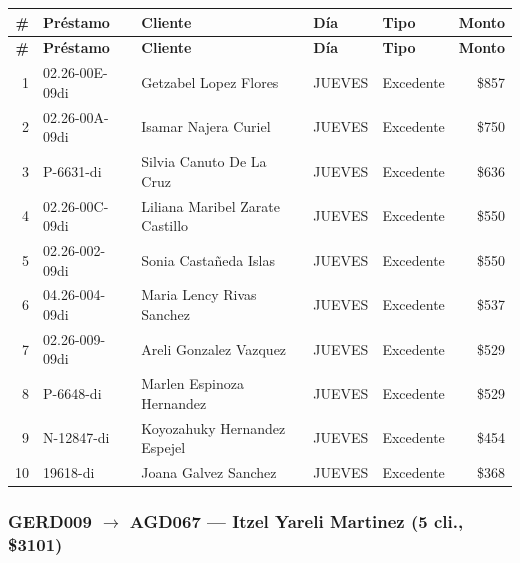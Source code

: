 \documentclass[11pt,a4paper]{article}
\newcommand{\money}[1]{\$\num{#1}}
\begin{document}
\begin{center}
\renewcommand{\arraystretch}{1.1}
\footnotesize
\begin{longtable}{rlp{5.5cm}llr}
\toprule
\textbf{\#} & \textbf{Pr\'estamo} & \textbf{Cliente} & \textbf{D\'ia} & \textbf{Tipo} & \textbf{Monto} \\
\midrule
\endfirsthead
\toprule
\textbf{\#} & \textbf{Pr\'estamo} & \textbf{Cliente} & \textbf{D\'ia} & \textbf{Tipo} & \textbf{Monto} \\
\midrule
\endhead
1 & 02.26-00E-09di & Getzabel Lopez Flores & JUEVES & Excedente & \money{857} \\
2 & 02.26-00A-09di & Isamar Najera Curiel & JUEVES & Excedente & \money{750} \\
3 & P-6631-di & Silvia Canuto De La Cruz & JUEVES & Excedente & \money{636} \\
4 & 02.26-00C-09di & Liliana Maribel Zarate Castillo & JUEVES & Excedente & \money{550} \\
5 & 02.26-002-09di & Sonia Castañeda Islas & JUEVES & Excedente & \money{550} \\
6 & 04.26-004-09di & Maria Lency Rivas Sanchez & JUEVES & Excedente & \money{537} \\
7 & 02.26-009-09di & Areli Gonzalez Vazquez & JUEVES & Excedente & \money{529} \\
8 & P-6648-di & Marlen Espinoza Hernandez & JUEVES & Excedente & \money{529} \\
9 & N-12847-di & Koyozahuky Hernandez Espejel & JUEVES & Excedente & \money{454} \\
10 & 19618-di & Joana Galvez Sanchez & JUEVES & Excedente & \money{368} \\

\bottomrule
\end{longtable}
\end{center}
\subsubsection{GERD009 $\rightarrow$ AGD067 --- Itzel Yareli Martinez (5 cli., \money{3101})}
\end{document}
